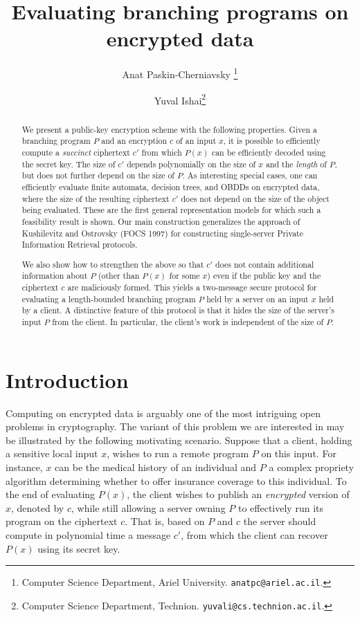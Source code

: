 \documentclass[11pt]{article}
\title{Evaluating branching programs on encrypted data}\label{sec-eval-bp}
\author{Anat Paskin-Cherniavsky \thanks{ Computer Science Department, Ariel University. {\tt anatpc@ariel.ac.il}.} 
\and Yuval Ishai\thanks{Computer Science Department, Technion. {\tt yuvali@cs.technion.ac.il}.}  }
\begin{document}
\maketitle
	
\begin{abstract}
	
	We present a public-key encryption scheme with the following
	properties. Given a branching program $P$ and an encryption $c$ of
	an input $x$, it is possible to efficiently compute a {\em succinct}
	ciphertext $c'$ from which $P(x)$ can be efficiently decoded using
	the secret key. The size of $c'$ depends polynomially on the size of
	$x$ and the {\em length} of $P$, but does not further depend on the
	size of $P$. As interesting special cases, one can efficiently
	evaluate finite automata, decision trees, and OBDDs on encrypted
	data, where the size of the resulting ciphertext $c'$ does not
	depend on the size of the object being evaluated. These are the
	first general representation models for which such a feasibility
	result is shown. Our main construction generalizes the approach of
	Kushilevitz and Ostrovsky (FOCS 1997) for constructing single-server
	Private Information Retrieval protocols.
	
	We also show how to strengthen the above so that $c'$ does not
	contain additional information about $P$ (other than $P(x)$ for some
	$x$) even if the public key and the ciphertext $c$ are maliciously
	formed. This yields a two-message secure protocol for evaluating a
	length-bounded branching program $P$ held by a server on an input
	$x$ held by a client. A distinctive feature of this protocol is that
	it hides the size of the server's input $P$ from the client. In
	particular, the client's work is independent of the size of $P$.
	
	
\end{abstract}

\section{Introduction}
Computing on encrypted data is arguably one of the most intriguing
open problems in cryptography. The variant of this problem we are
interested in may be illustrated by the following motivating
scenario. Suppose that a client, holding a sensitive local input
$x$, wishes to run a remote program $P$ on this input. For
instance, $x$ can be the medical history of an individual and $P$ a
complex propriety algorithm determining whether to offer insurance
coverage to this individual. To the end of evaluating $P(x)$, the
client wishes to publish an {\em encrypted} version of $x$, denoted
by $c$, while still allowing a server owning $P$ to effectively run
its program on the ciphertext $c$. That is, based on $P$ and $c$
the server should compute in polynomial time a message $c'$, from
which the client can recover $P(x)$ using its secret key.
\end{document}
